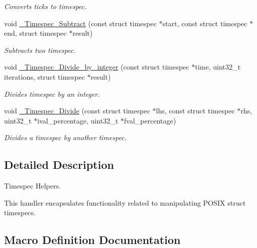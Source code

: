 \begin{DoxyCompactItemize}
\begin{DoxyCompactList}\small\item\em Converts ticks to timespec. \end{DoxyCompactList}\item 
void \mbox{\hyperlink{group__Timespec_gaa3d0b8cf3ba2b22e8bffae07c7ec7408}{\+\_\+\+Timespec\+\_\+\+Subtract}} (const struct timespec $\ast$start, const struct timespec $\ast$end, struct timespec $\ast$result)
\begin{DoxyCompactList}\small\item\em Subtracts two timespec. \end{DoxyCompactList}\item 
void \mbox{\hyperlink{group__Timespec_gafeb09a5e78020a734aad0fb42feb7057}{\+\_\+\+Timespec\+\_\+\+Divide\+\_\+by\+\_\+integer}} (const struct timespec $\ast$time, uint32\+\_\+t iterations, struct timespec $\ast$result)
\begin{DoxyCompactList}\small\item\em Divides timespec by an integer. \end{DoxyCompactList}\item 
void \mbox{\hyperlink{group__Timespec_ga098b04e1bc31a65688df2971188fca06}{\+\_\+\+Timespec\+\_\+\+Divide}} (const struct timespec $\ast$lhs, const struct timespec $\ast$rhs, uint32\+\_\+t $\ast$ival\+\_\+percentage, uint32\+\_\+t $\ast$fval\+\_\+percentage)
\begin{DoxyCompactList}\small\item\em Divides a timespec by another timespec. \end{DoxyCompactList}\end{DoxyCompactItemize}


\subsection{Detailed Description}
Timespec Helpers. 

This handler encapsulates functionality related to manipulating P\+O\+S\+IX struct timespecs. 

\subsection{Macro Definition Documentation}
\mbox{\label{group__Timespec_gac166c49ce5d03894939298956202bbb1}} 
